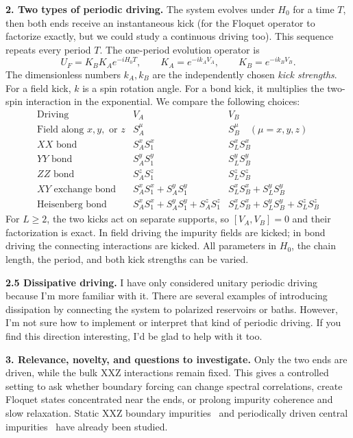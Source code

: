 \documentclass[10pt,a4paper]{article}
\begin{document}
\textbf{2. Two types of periodic driving.}
The system evolves under $H_0$ for a time $T$, then both ends receive an instantaneous kick (for the Floquet operator to factorize exactly, but we could study a continuous driving too).
This sequence repeats every period $T$. The one-period evolution operator is
\[
U_F=K_BK_Ae^{-iH_0T},\qquad K_A=e^{-ik_AV_A},\qquad K_B=e^{-ik_BV_B}.
\]
The dimensionless numbers $k_A,k_B$ are the independently chosen \emph{kick strengths}.
For a field kick, $k$ is a spin rotation angle. For a bond kick, it multiplies the two-spin interaction in the exponential.
We compare the following choices:
\[
\renewcommand{\arraystretch}{1.12}
\begin{array}{lll}
\text{Driving} & V_A & V_B\\ \hline
\text{Field along }x,y,\text{ or }z
 & S_A^\mu & S_B^\mu\quad(\mu=x,y,z)\\
XX\text{ bond} & S_A^xS_1^x & S_L^xS_B^x\\
YY\text{ bond} & S_A^yS_1^y & S_L^yS_B^y\\
ZZ\text{ bond} & S_A^zS_1^z & S_L^zS_B^z\\
XY\text{ exchange bond} & S_A^xS_1^x+S_A^yS_1^y & S_L^xS_B^x+S_L^yS_B^y\\
\text{Heisenberg bond} &
 S_A^xS_1^x+S_A^yS_1^y+S_A^zS_1^z &
 S_L^xS_B^x+S_L^yS_B^y+S_L^zS_B^z
\end{array}
\]
For $L\geq2$, the two kicks act on separate supports, so $[V_A,V_B]=0$ and their factorization is exact.
In field driving the impurity fields are kicked; in bond driving the connecting interactions are kicked.
All parameters in $H_0$, the chain length, the period, and both kick strengths can be varied.

\textbf{2.5 Dissipative driving.}
I have only considered unitary periodic driving because I'm more familiar with it. There are several examples of introducing dissipation by connecting the system to polarized reservoirs or baths. However, I'm not sure how to implement or interpret that kind of periodic driving. If you find this direction interesting, I'd be glad to help with it too.

\textbf{3. Relevance, novelty, and questions to investigate.}
Only the two ends are driven, while the bulk XXZ interactions remain fixed.
This gives a controlled setting to ask whether boundary forcing can change spectral correlations, create Floquet states concentrated near the ends, or prolong impurity coherence and slow relaxation.
Static XXZ boundary impurities~\cite{kattel2025} and periodically driven central impurities~\cite{lin2025} have already been studied.
\end{document}
